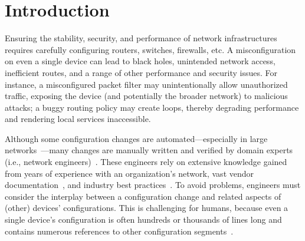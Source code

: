 
\section{Introduction}
\label{sec:intro}

Ensuring the stability, security, and performance of network infrastructures %
requires carefully configuring routers, switches, firewalls, etc. A misconfiguration on even a single device can lead to black holes, unintended network access, inefficient routes, and a range of other performance and security issues. For instance, a misconfigured packet filter may unintentionally allow unauthorized traffic, exposing the device (and potentially the broader network) to malicious attacks; a buggy routing policy may create loops, thereby degrading performance and rendering local services inaccessible.

Although some configuration changes are automated---especially in large networks~\cite{tian2019jinjing, ramanathan2023aura, mahimkar2022aurora, rasche2023esnet}---many changes are manually written and verified by domain experts (i.e., network engineers)~\cite{abhashkumar2020aed}. These engineers rely on extensive 
knowledge gained from years of experience with an organization's network, vast vendor documentation~\cite{ciscosupport, junosdocumentation}, and industry best practices~\cite{manrs}. To avoid problems, engineers must consider the interplay between a configuration change and related aspects of (other) devices' configurations.
This is challenging for humans, because even a single device's configuration is often hundreds or thousands of lines long and contains numerous references to other configuration segments~\cite{benson2009complexitymetrics}.


